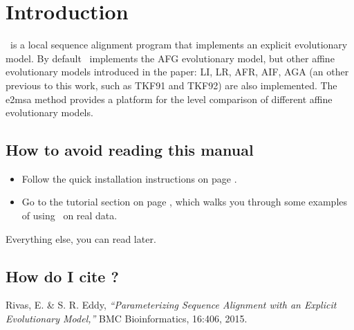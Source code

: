 \section{Introduction}
\setcounter{footnote}{0}

\etwomsa\ is a local sequence alignment program that implements an
explicit evolutionary model.  By default \etwomsa\ implements the AFG
evolutionary model, but other affine evolutionary models introduced in
the paper: LI, LR, AFR, AIF, AGA (an other previous to this work, such
as TKF91 and TKF92) are also implemented.  The e2msa method provides a
platform for the level comparison of different affine evolutionary
models.


\subsection{How to avoid reading this manual}

\begin{itemize}
\item Follow the quick installation instructions on page
      \pageref{section:installation}. 
\item Go to the tutorial section on page
\pageref{section:tutorial}, which walks you through some examples of
using \etwomsa\ on real data.
\end{itemize}

Everything else, you can read later.



\subsection{How do I cite \etwomsa?}

Rivas, E. \& S. R. Eddy, \textit{``Parameterizing Sequence Alignment
  with an Explicit Evolutionary Model,''} BMC
Bioinformatics, 16:406, 2015.











  









